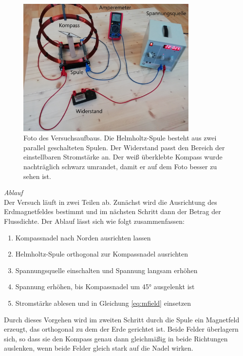 \begin{figure}[h!]
	\centering
	\includegraphics[width=0.8\textwidth]{images/papers/setup_labled.jpg}
	\caption{Foto des Versuchsaufbaus. Die Helmholtz-Spule besteht aus zwei parallel geschalteten Spulen. Der Widerstand passt den Bereich der einstellbaren Stromstärke an. Der weiß überklebte Kompass wurde nachträglich schwarz umrandet, damit er auf dem Foto besser zu sehen ist.}
	\label{img:experiment-devices}
\end{figure}

\textit{Ablauf}\\
Der Versuch läuft in zwei Teilen ab. Zunächst wird die Ausrichtung des Erdmagnetfeldes bestimmt und im nächsten Schritt dann der Betrag der Flussdichte. Der Ablauf lässt sich wie folgt zusammenfassen:
\begin{enumerate}
	\setlength{\itemsep}{-2pt}
	\item Kompassnadel nach Norden ausrichten lassen
	\item Helmholtz-Spule orthogonal zur Kompassnadel ausrichten
	\item Spannungsquelle einschalten und Spannung langsam erhöhen
	\item Spannung erhöhen, bis Kompassnadel um 45° ausgelenkt ist
	\item Stromstärke ablesen und in Gleichung \eqref{eq:mfield} einsetzen
\end{enumerate}

Durch dieses Vorgehen wird im zweiten Schritt durch die Spule ein Magnetfeld erzeugt, das orthogonal zu dem der Erde gerichtet ist. Beide Felder überlagern sich, so dass sie den Kompass genau dann gleichmäßig in beide Richtungen auslenken, wenn beide Felder gleich stark auf die Nadel wirken.

